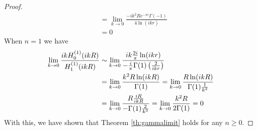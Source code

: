 \documentclass[]{article}
\begin{document}
\begin{proof}
\begin{align}
			&= \lim_{k\to 0}\frac{-ik^2Re^{-\pi i}\Gamma(-1)}{4\ln(ikr)}\\
			&= 0
		\end{align}
		When $n =1$ we have 
		\begin{align}
			\lim_{k\to 0}\frac{ikH^{(1)}_{0}(ikR)}{H^{(1)}_1(ikR)} &\sim \lim_{k\to 0}\frac{ik\frac{2i}{\pi}\ln(ikr)}{-\frac{i}{\pi}\Gamma(1)\left( {\frac{2}{ikr}} \right)} \\
			&= \lim_{k\to 0}\frac{k^2R\ln(ikR)}{\Gamma(1)} = \lim_{k\to 0}\frac{R\ln(ikR)}{\Gamma(1)\frac{1}{k^2}} \\
			&= \lim_{k\to 0}\frac{R\frac{iR}{ikR}}{-\Gamma(1)\frac{2}{k^3}}= \lim_{k\to 0}\frac{k^2R}{2\Gamma(1)} = 0
		\end{align}
		With this, we have shown that Theorem \ref{th:gammalimit} holds for any $n\geq 0$.
	\end{proof}
\end{document}
